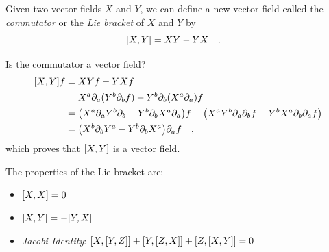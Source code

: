 \documentclass[landscape,aspectratio=169]{slides}
\begin{document}
\begin{slide}
	Given two vector fields $ X $ and $ Y $, we can define a new vector field called the \textit{commutator} or the \textit{Lie bracket} of $ X $ and $ Y $ by
	\begin{equation}\label{key}
	\qty[X, Y] = XY - YX \qq{.}
	\end{equation}
	
	Is the commutator a vector field?
	\begin{align*}
	\qty[X, Y] f &= XYf - YXf \\
	&= X^a \partial_a ( Y^b \partial_b f  ) - Y^b \partial_b (X^a \partial_a ) f \\
	&=\qty(X^a \partial_a Y^b \partial_b    - Y^b \partial_b X^a \partial_a ) f  + \qty(X^a Y^b \partial_a  \partial_b f - Y^b X^a \partial_b \partial_a f) \\
	& = \qty(X^b \partial_b Y^a     - Y^b \partial_b X^a ) \partial_a f \qq{,} 
	\end{align*}
	which proves that $ \qty[X,Y] $ is a vector field.
\end{slide}
\begin{slide}	
	The properties of the Lie bracket are:
	\begin{itemize}
		\item  $ \qty[X,X] = 0 $
		\item $ \comm{X}{Y} = - \comm{Y}{X} $
		\item \textit{Jacobi Identity}: $ \comm{X}{\comm{Y}{Z}} + \comm{Y}{\comm{Z}{X}} + \comm{Z}{\comm{X}{Y}} = 0 $
	\end{itemize}
\end{slide}
\end{document}

